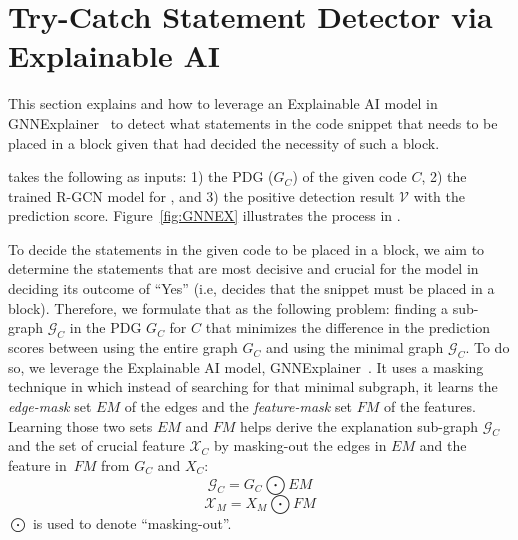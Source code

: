 \section{Try-Catch Statement Detector via Explainable AI}
\label{interpretation:sec}

This section explains {\xstate} and how to leverage an Explainable AI
model in GNNExplainer~\cite{GNNExplainer} to detect what statements in
the code snippet that needs to be placed in a  block
given that {\xblock} had decided the necessity of such a block.

{\xstate} takes the following as inputs: 1) the PDG ($G_C$) of the
given code $C$, 2) the trained R-GCN model for {\xblock}, and 3) the
positive detection result $\mathcal{V}$ with the prediction score.
Figure~\ref{fig:GNNEX} illustrates the process in {\xstate}.






To decide the statements in the given code to be placed in a
 block, we aim to determine the statements that are
most decisive and crucial for the {\xblock} model in deciding its
outcome of ``Yes'' (i.e, {\xblock} decides that the snippet must be
placed in a  block). Therefore, we formulate that as
the following problem: finding a sub-graph $\mathcal{G}_C$ in the PDG
$G_C$ for $C$ that minimizes the difference in the prediction scores
between using the entire graph $G_C$ and using the minimal graph
$\mathcal{G}_C$. To do so, we leverage the Explainable AI model,
GNNExplainer~\cite{GNNExplainer}. It uses a masking technique in which
instead of searching for that minimal subgraph, it learns the {\em
  edge-mask} set $EM$ of the edges and the {\em feature-mask} set $FM$
of the features. Learning those two sets $EM$ and $FM$ helps derive
the explanation sub-graph $\mathcal{G}_C$ and the set of crucial
feature $\mathcal{X}_C$ by masking-out the edges in $EM$ and the
feature in~$FM$ from $G_C$ and $X_C$:
\begin{equation}\label{eq:11}
\mathcal{G}_C = G_C \bigodot EM
\end{equation}
\begin{equation}\label{eq:12}
\mathcal{X}_M = X_M \bigodot FM
\end{equation}
$\bigodot$ is used to denote ``masking-out''.

